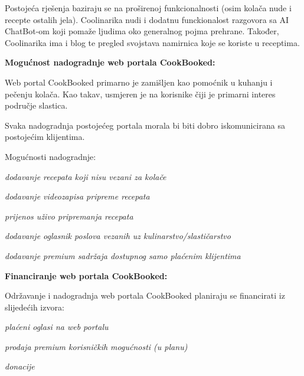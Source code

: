		\bigskip
		\bigskip
		\bigskip

		Postojeća rješenja baziraju se na proširenoj funkcionalnosti (osim kolača nude i recepte ostalih jela).
		Coolinarika nudi i dodatnu funckionalost razgovora sa AI ChatBot-om koji pomaže ljudima oko generalnog
		pojma prehrane. Također, Coolinarika ima i blog te pregled svojstava namirnica koje se koriste u receptima.

		\bigskip

		\textbf{Mogućnost nadogradnje web portala CookBooked:}

		Web portal CookBooked primarno je zamišljen kao pomoćnik u kuhanju i pečenju kolača.
		Kao takav, usmjeren je na korisnike čiji je primarni interes područje slastica.

		\smallskip

		Svaka nadogradnja postojećeg portala morala bi biti dobro iskomunicirana sa postojećim klijentima.

		\smallskip

		Mogućnosti nadogradnje:
		
		\begin{packed_item}
			\item \textit{dodavanje recepata koji nisu vezani za kolače}
			\item \textit{dodavanje videozapisa pripreme recepata}
			\item \textit{prijenos uživo pripremanja recepata}
			\item \textit{dodavanje oglasnik poslova vezanih uz kulinarstvo/slastičarstvo}
			\item \textit{dodavanje premium sadržaja dostupnog samo plaćenim klijentima}
		\end{packed_item}

		\textbf{Financiranje web portala CookBooked:}

		Održavanje i nadogradnja web portala CookBooked planiraju se financirati iz slijedećih izvora:

		\begin{packed_item}
			\item \textit{plaćeni oglasi na web portalu}
			\item \textit{prodaja premium korisničkih mogućnosti (u planu)}
			\item \textit{donacije}
		\end{packed_item}




		\eject
		
	